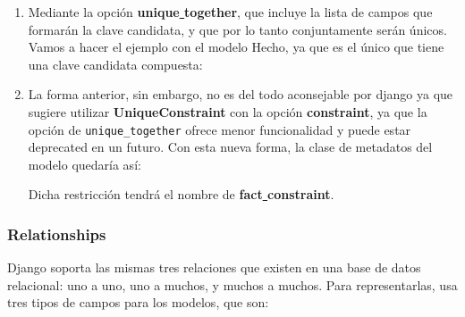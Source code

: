    \begin{enumerate}
        \item Mediante la opción \textbf{unique\underline{ }together}, que incluye la lista
        de campos que formarán la clave candidata, y que por lo tanto conjuntamente serán
        únicos. Vamos a hacer el ejemplo con el modelo Hecho, ya que es el único que tiene
        una clave candidata compuesta:
        

        \item La forma anterior, sin embargo, no es del todo aconsejable por django ya
        que sugiere utilizar \textbf{UniqueConstraint} con la opción \textbf{constraint},
        ya que la opción de \verb|unique_together| ofrece menor funcionalidad y puede
        estar deprecated en un futuro. Con esta nueva forma, la clase de metadatos
        del modelo quedaría así:
        

    Dicha restricción tendrá el nombre de \textbf{fact\underline{ }constraint}.
    \end{enumerate}

    \subsubsection{Relationships}
    Django soporta las mismas tres relaciones que existen en una base de datos relacional:
    uno a uno, uno a muchos, y muchos a muchos. Para representarlas, usa tres tipos de campos
    para los modelos, que son:

